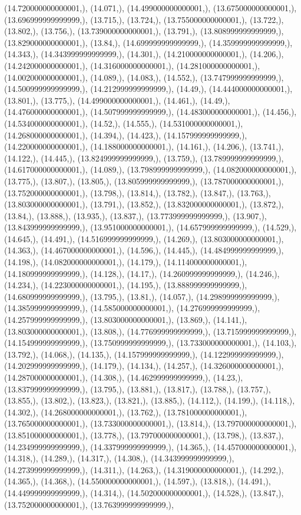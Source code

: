 \documentclass{article}
\begin{document}
(14.720000000000001,), (14.071,), (14.499000000000001,), (13.675000000000001,), (13.696999999999999,), (13.715,), (13.724,), (13.755000000000001,), (13.722,), (13.802,), (13.756,), (13.739000000000001,), (13.791,), (13.808999999999999,), (13.829000000000001,), (13.84,), (14.699999999999999,), (14.359999999999999,), (14.343,), (14.343999999999999,), (14.301,), (14.210000000000001,), (14.206,), (14.242000000000001,), (14.316000000000001,), (14.281000000000001,), (14.002000000000001,), (14.089,), (14.083,), (14.552,), (13.747999999999999,), (14.500999999999999,), (14.212999999999999,), (14.49,), (14.444000000000001,), (13.801,), (13.775,), (14.499000000000001,), (14.461,), (14.49,), (14.476000000000001,), (14.507999999999999,), (14.483000000000001,), (14.456,), (14.534000000000001,), (14.52,), (14.555,), (14.531000000000001,), (14.268000000000001,), (14.394,), (14.423,), (14.157999999999999,), (14.220000000000001,), (14.188000000000001,), (14.161,), (14.206,), (13.741,), (14.122,), (14.445,), (13.824999999999999,), (13.759,), (13.789999999999999,), (14.617000000000001,), (14.089,), (13.798999999999999,), (14.082000000000001,), (13.775,), (13.807,), (13.805,), (13.805999999999999,), (13.787000000000001,), (13.752000000000001,), (13.798,), (13.814,), (13.782,), (13.847,), (13.763,), (13.803000000000001,), (13.791,), (13.852,), (13.832000000000001,), (13.872,), (13.84,), (13.888,), (13.935,), (13.837,), (13.773999999999999,), (13.907,), (13.843999999999999,), (13.951000000000001,), (14.657999999999999,), (14.529,), (14.645,), (14.491,), (14.516999999999999,), (14.269,), (13.803000000000001,), (14.363,), (14.467000000000001,), (14.596,), (14.445,), (14.484999999999999,), (14.198,), (14.082000000000001,), (14.179,), (14.114000000000001,), (14.180999999999999,), (14.128,), (14.17,), (14.260999999999999,), (14.246,), (14.234,), (14.223000000000001,), (14.195,), (13.888999999999999,), (14.680999999999999,), (13.795,), (13.81,), (14.057,), (14.298999999999999,), (14.385999999999999,), (14.585000000000001,), (14.276999999999999,), (14.257999999999999,), (13.803000000000001,), (13.869,), (14.141,), (13.803000000000001,), (13.808,), (14.776999999999999,), (13.715999999999999,), (14.154999999999999,), (13.750999999999999,), (13.733000000000001,), (14.103,), (13.792,), (14.068,), (14.135,), (14.157999999999999,), (14.122999999999999,), (14.202999999999999,), (14.179,), (14.134,), (14.257,), (14.326000000000001,), (14.287000000000001,), (14.308,), (14.462999999999999,), (14.23,), (13.837999999999999,), (13.795,), (13.881,), (13.817,), (13.788,), (13.757,), (13.855,), (13.802,), (13.823,), (13.821,), (13.885,), (14.112,), (14.199,), (14.118,), (14.302,), (14.268000000000001,), (13.762,), (13.781000000000001,), (13.765000000000001,), (13.733000000000001,), (13.814,), (13.797000000000001,), (13.851000000000001,), (13.778,), (13.797000000000001,), (13.798,), (13.837,), (14.234999999999999,), (14.337999999999999,), (14.365,), (14.457000000000001,), (14.318,), (14.289,), (14.317,), (14.308,), (14.343999999999999,), (14.273999999999999,), (14.311,), (14.263,), (14.319000000000001,), (14.292,), (14.365,), (14.368,), (14.550000000000001,), (14.597,), (13.818,), (14.491,), (14.449999999999999,), (14.314,), (14.502000000000001,), (14.528,), (13.847,), (13.752000000000001,), (13.763999999999999,), 
\end{document}
